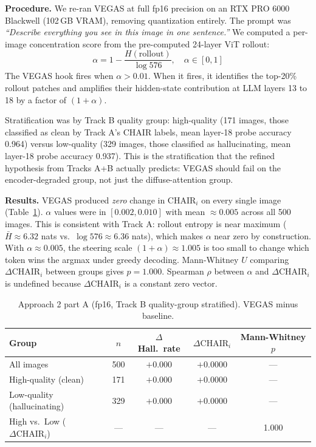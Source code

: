 \documentclass[11pt]{article}
\begin{document}
\textbf{Procedure.} We re-ran VEGAS at full fp16 precision on an RTX PRO 6000
Blackwell (102\,GB VRAM), removing quantization entirely. The prompt was
\textit{``Describe everything you see in this image in one sentence.''} We computed a
per-image concentration score from the pre-computed 24-layer ViT rollout:
\begin{equation}
  \alpha = 1 - \frac{H(\mathrm{rollout})}{\log 576}, \quad \alpha \in [0, 1]
\end{equation}
The VEGAS hook fires when $\alpha > 0.01$. When it fires, it identifies the top-20\%
rollout patches and amplifies their hidden-state contribution at LLM layers 13 to 18
by a factor of $(1 + \alpha)$.

Stratification was by Track B quality group: high-quality (171 images, those classified
as clean by Track A's CHAIR labels, mean layer-18 probe accuracy 0.964) versus
low-quality (329 images, those classified as hallucinating, mean layer-18 probe accuracy
0.937). This is the stratification that the refined hypothesis from Tracks A+B actually
predicts: VEGAS should fail on the encoder-degraded group, not just the diffuse-attention
group.

\textbf{Results.} VEGAS produced \emph{zero} change in $\mathrm{CHAIR}_i$ on every
single image (Table~\ref{tab:trackc_v2}). $\alpha$ values were in $[0.002, 0.010]$ with
mean $\approx 0.005$ across all 500 images. This is consistent with Track A: rollout
entropy is near maximum ($\bar{H} \approx 6.32$ nats vs.\ $\log 576 \approx 6.36$
nats), which makes $\alpha$ near zero by construction. With $\alpha \approx 0.005$,
the steering scale $(1 + \alpha) \approx 1.005$ is too small to change which token
wins the argmax under greedy decoding. Mann-Whitney $U$ comparing $\Delta
\mathrm{CHAIR}_i$ between groups gives $p = 1.000$. Spearman $\rho$ between $\alpha$
and $\Delta\mathrm{CHAIR}_i$ is undefined because $\Delta\mathrm{CHAIR}_i$ is a
constant zero vector.

\begin{table}[!ht]
\centering
\small
\caption{Approach 2 part A (fp16, Track B quality-group stratified). VEGAS minus
         baseline.}
\label{tab:trackc_v2}
\begin{tabular}{lcccc}
\toprule
\textbf{Group} & $n$ & $\Delta$ Hall.\ rate & $\Delta\mathrm{CHAIR}_i$
               & \textbf{Mann-Whitney $p$} \\
\midrule
All images                  & 500 & $+0.000$ & $+0.0000$ & --- \\
High-quality (clean)        & 171 & $+0.000$ & $+0.0000$ & --- \\
Low-quality (hallucinating) & 329 & $+0.000$ & $+0.0000$ & --- \\
High vs.\ Low ($\Delta\mathrm{CHAIR}_i$) & --- & --- & --- & 1.000 \\
\bottomrule
\end{tabular}
\end{table}
\end{document}
